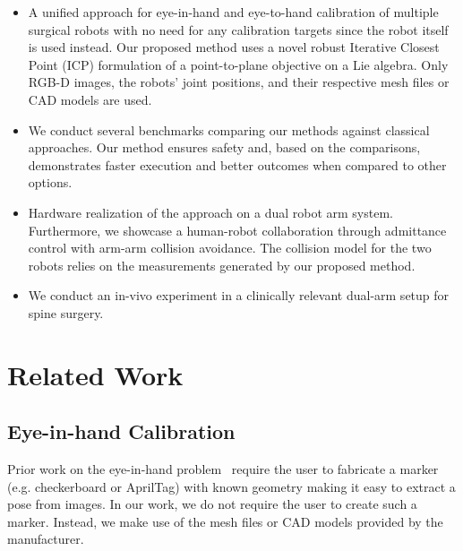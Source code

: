 \begin{itemize}
    \item A unified approach for eye-in-hand and eye-to-hand calibration of multiple surgical robots with no need for any calibration targets since the robot itself is used instead. Our proposed method uses a novel robust Iterative Closest Point (ICP) formulation of a point-to-plane objective on a Lie algebra. Only RGB-D images, the robots' joint positions, and their respective mesh files or CAD models are used.
    \item We conduct several benchmarks comparing our methods against classical approaches. Our method ensures safety and, based on the comparisons, demonstrates faster execution and better outcomes when compared to other options.
    \item Hardware realization of the approach on a dual robot arm system. Furthermore, we showcase a human-robot collaboration through admittance control with arm-arm collision avoidance. The collision model for the two robots relies on the measurements generated by our proposed method.
    \item We conduct an in-vivo experiment in a clinically relevant dual-arm setup for spine surgery.
\end{itemize}




\section{Related Work}
\subsection{Eye-in-hand Calibration}
Prior work on the eye-in-hand problem~\cite{Horaud95, Strobl06} require the user to fabricate a marker (e.g. checkerboard or AprilTag\cite{Olson11}) with known geometry making it easy to extract a pose from images. In our work, we do not require the user to create such a marker.
Instead, we make use of the mesh files or CAD models provided by the manufacturer.

